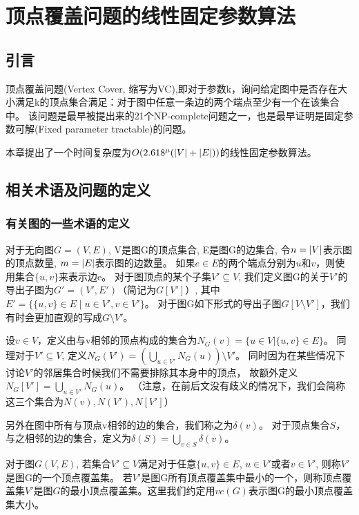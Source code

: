 \chapter{顶点覆盖问题的线性固定参数算法}
\section{引言}
顶点覆盖问题(Vertex Cover, 缩写为VC),即对于参数k，询问给定图中是否存在大小满足k的顶点集合满足：对于图中任意一条边的两个端点至少有一个在该集合中。
该问题是最早被提出来的21个NP-complete问题之一\cite{karp1972reducibility}，也是最早证明是固定参数可解(Fixed parameter tractable)的问题\cite{downey2012parameterized}。

本章提出了一个时间复杂度为$O(2.618^{\mu}(\left\vert V \right\vert + \left\vert E \right\vert))$的线性固定参数算法。

\section{相关术语及问题的定义}
\subsection{有关图的一些术语的定义}
对于无向图$G=(V,E)$, V是图G的顶点集合, E是图G的边集合, 令$n = \left\vert V \right\vert$表示图的顶点数量, $m = \left\vert E \right\vert$表示图的边数量。
如果$e \in E$的两个端点分别为$u$和$v$，则使用集合$\{u, v \}$来表示边e。
对于图顶点的某个子集$V' \subseteq V$, 我们定义图G的关于$V'$的导出子图为$G' = (V', E')$（简记为$G[V']$）, 其中$E' = \{\{u, v\} \in E\;|\;u \in V', v \in V' \}$。
对于图G如下形式的导出子图$G[V \setminus V']$，我们有时会更加直观的写成$G \setminus V'$。

设$v \in V$，定义由与v相邻的顶点构成的集合为$N_{G}(v) = \{ u \in V | \{u, v\} \in E\}$。
同理对于$V' \subseteq V$, 定义$N_{G}(V') = (\bigcup_{u \in V'}N_{G}(u)) \setminus V' $。
同时因为在某些情况下讨论$V'$的邻居集合时候我们不需要排除其本身中的顶点，
故额外定义$N_{G}[V'] = \bigcup_{u \in V'}N_{G}(u)$。
（注意，在前后文没有歧义的情况下，我们会简称这三个集合为$N(v), N(V'),N[V']$）

另外在图中所有与顶点v相邻的边的集合，我们称之为$\delta(v)$。
对于顶点集合$S$，与之相邻的边的集合，定义为$\delta(S) = \bigcup_{v \in S}\delta(v)$。

\begin{definition}[顶点覆盖集]
对于图$G(V, E)$, 若集合$V' \subseteq V$满足对于任意$\{u, v\} \in E$, $u \in V'$或者$v \in V'$, 则称$V'$是图G的一个顶点覆盖集。
若$V'$是图G所有顶点覆盖集中最小的一个，则称顶点覆盖集$V'$是图$G$的最小顶点覆盖集。这里我们约定用$vc(G)$表示图G的最小顶点覆盖集大小。
\end{definition}

